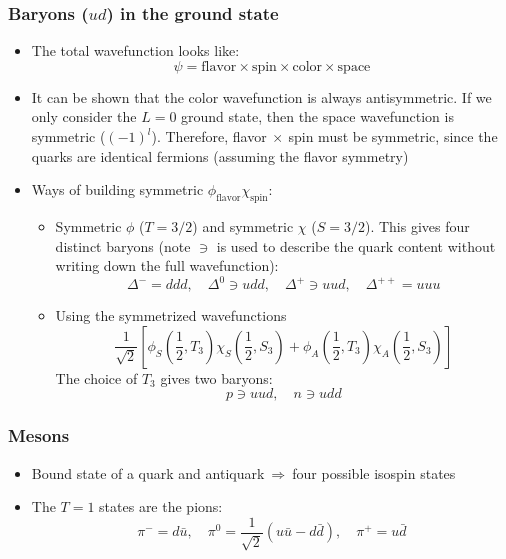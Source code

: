 \documentclass[11pt]{article}
\newcommand{\ubar}{\bar{u}}
\newcommand{\dbar}{\bar{d}}
\newcommand{\thus}{\ensuremath{~\Rightarrow~}}
\begin{document}
\subsubsection{Baryons ($ud$) in the ground state}
\begin{itemize}
  \item The total wavefunction looks like:
  \begin{equation}
    \psi = \text{flavor}\times\text{spin}\times\text{color}\times\text{space}
  \end{equation}
  \item It can be shown that the color wavefunction is always antisymmetric. If we only consider the $L=0$ ground state, then the space wavefunction is symmetric ($(-1)^l$). Therefore, flavor$~\times~$spin must be symmetric, since the quarks are identical fermions (assuming the flavor symmetry)
  \item Ways of building symmetric $\phi_\text{flavor}\chi_\text{spin}$:
  \begin{itemize}
    \item Symmetric $\phi$ ($T=3/2$) and symmetric $\chi$ ($S=3/2$). This gives four distinct baryons (note $\ni$ is used to describe the quark content without writing down the full wavefunction):
    \begin{equation}
      \Delta^- = ddd,\quad
      \Delta^0 \ni udd,\quad
      \Delta^+ \ni uud,\quad
      \Delta^{++} = uuu
    \end{equation}
    \item Using the symmetrized wavefunctions 
    \begin{equation}
    \dfrac{1}{\sqrt2}\left[\phi_S\left(\frac{1}{2},T_3\right)\chi_S\left(\frac{1}{2},S_3\right)+\phi_A\left(\frac{1}{2},T_3\right)\chi_A\left(\frac{1}{2},S_3\right)\right]
    \end{equation}
    The choice of $T_3$ gives two baryons:
    \begin{equation}
      p \ni uud, \quad n \ni udd
    \end{equation}
  \end{itemize}
\end{itemize}

\subsubsection{Mesons}
\begin{itemize}
  \item Bound state of a quark and antiquark\thus four possible isospin states
  \item The $T=1$ states are the pions:
  \begin{equation}
    \pi^- = d\ubar,\quad \pi^0 = \frac{1}{\sqrt2} (u\ubar-d\dbar),\quad \pi^+ = u\dbar
  \end{equation}
\end{itemize}
\end{document}
